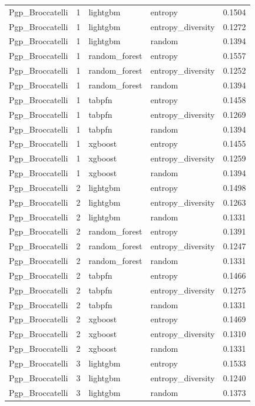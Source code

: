 \begin{tabular}{lrllr}
Pgp_Broccatelli & 1 & lightgbm & entropy & 0.1504 \\
Pgp_Broccatelli & 1 & lightgbm & entropy_diversity & 0.1272 \\
Pgp_Broccatelli & 1 & lightgbm & random & 0.1394 \\
Pgp_Broccatelli & 1 & random_forest & entropy & 0.1557 \\
Pgp_Broccatelli & 1 & random_forest & entropy_diversity & 0.1252 \\
Pgp_Broccatelli & 1 & random_forest & random & 0.1394 \\
Pgp_Broccatelli & 1 & tabpfn & entropy & 0.1458 \\
Pgp_Broccatelli & 1 & tabpfn & entropy_diversity & 0.1269 \\
Pgp_Broccatelli & 1 & tabpfn & random & 0.1394 \\
Pgp_Broccatelli & 1 & xgboost & entropy & 0.1455 \\
Pgp_Broccatelli & 1 & xgboost & entropy_diversity & 0.1259 \\
Pgp_Broccatelli & 1 & xgboost & random & 0.1394 \\
Pgp_Broccatelli & 2 & lightgbm & entropy & 0.1498 \\
Pgp_Broccatelli & 2 & lightgbm & entropy_diversity & 0.1263 \\
Pgp_Broccatelli & 2 & lightgbm & random & 0.1331 \\
Pgp_Broccatelli & 2 & random_forest & entropy & 0.1391 \\
Pgp_Broccatelli & 2 & random_forest & entropy_diversity & 0.1247 \\
Pgp_Broccatelli & 2 & random_forest & random & 0.1331 \\
Pgp_Broccatelli & 2 & tabpfn & entropy & 0.1466 \\
Pgp_Broccatelli & 2 & tabpfn & entropy_diversity & 0.1275 \\
Pgp_Broccatelli & 2 & tabpfn & random & 0.1331 \\
Pgp_Broccatelli & 2 & xgboost & entropy & 0.1469 \\
Pgp_Broccatelli & 2 & xgboost & entropy_diversity & 0.1310 \\
Pgp_Broccatelli & 2 & xgboost & random & 0.1331 \\
Pgp_Broccatelli & 3 & lightgbm & entropy & 0.1533 \\
Pgp_Broccatelli & 3 & lightgbm & entropy_diversity & 0.1240 \\
Pgp_Broccatelli & 3 & lightgbm & random & 0.1373 \\

\end{tabular}
